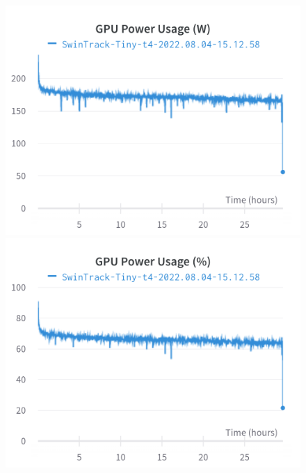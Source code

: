 \documentclass{article}
\begin{document}
\begin{figure}[h]
\includegraphics[width=\linewidth]{charts/Section-4-Panel-6-0i8v5s4ys}
\caption{}
\endminipage\hfill
{}
\includegraphics[width=\linewidth]{charts/Section-4-Panel-7-mmeofopv2}
\caption{}
\endminipage
\end{figure}
\end{document}
